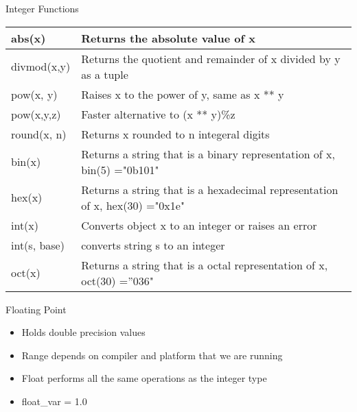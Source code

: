 % 
% 
% 
\begin{Slide}{Integer Functions}

  \begin{table}[h]
    \begin{tabular}{|l|p{8cm}|} \hline
      abs(x)    & Returns the absolute value of x \\ \hline
      divmod(x,y)    & Returns the quotient and remainder of x divided by y as a tuple \\ \hline
      pow(x, y)  & Raises x to the power of y, same as x ** y\\ \hline 
      pow(x,y,z)    & Faster alternative to (x ** y)\%z \\ \hline
      round(x, n)   & Returns x rounded to n integeral digits  \\ \hline
      bin(x)  & Returns a string that is a binary representation of x, bin(5) ="0b101" \\ \hline
      hex(x)   &Returns a string that is a hexadecimal representation of x, hex(30) ="0x1e" \\ \hline
      int(x)     & Converts object x to an integer or raises an error\\ \hline
      int(s, base)     & converts string s to an integer  \\ \hline
      oct(x)     & Returns a string that is a octal representation of x, oct(30) =''036" \\ \hline
    \end{tabular}
  \end{table}

\end{Slide}


% 
% 
% 
\begin{Slide}{Floating Point}
  \begin{itemize}
  \item Holds double precision values
  \item Range depends on compiler and platform that we are running
  \item Float performs all the same operations as the integer type
  \item float\_var = 1.0
  \end{itemize}
\end{Slide}


